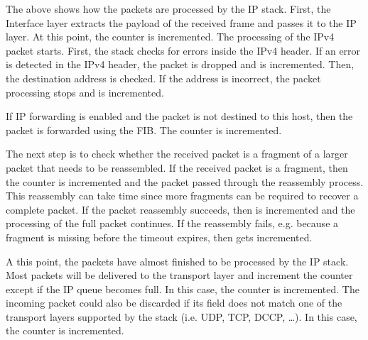 \documentclass[letterpaper,10pt,english]{sphinxmanual}
\begin{document}
\begin{sphinxVerbatim}[commandchars=\\\{\}]
\end{sphinxVerbatim}

\sphinxAtStartPar
The  above shows how the packets are processed by the
IP stack. First, the Interface layer extracts the payload of the
received frame and passes it to the IP layer. At this point, the
 counter is incremented. The processing of the
IPv4 packet starts. First, the stack checks for errors inside the IPv4
header. If an error is detected in the IPv4 header, the packet is dropped
and  is incremented. Then, the destination address is checked.
If the address is incorrect, the packet processing stops and 
is incremented.

\sphinxAtStartPar
If IP forwarding is enabled and the packet is not destined to this host,
then the packet is forwarded using the FIB. The  counter
is incremented.

\sphinxAtStartPar
The next step is to check whether the received packet is a fragment of
a larger packet that needs to be reassembled. If the received packet is a
fragment, then the  counter is incremented and the
packet passed through the reassembly process. This reassembly can take time
since more fragments can be required to recover a complete packet. If
the packet reassembly succeeds, then  is incremented and
the processing of the full packet continues. If the reassembly fails, e.g.
because a fragment is missing before the timeout expires, then
 gets incremented.

\sphinxAtStartPar
A this point, the packets have almost finished to be processed by the
IP stack. Most packets will be delivered to the transport layer
and increment the  counter except if the IP queue becomes
full. In this case, the  counter is incremented.
The incoming packet could also be discarded if its  field
does not match one of the transport layers supported by the stack
(i.e. UDP, TCP, DCCP, …). In this case, the 
counter is incremented.
\end{document}
